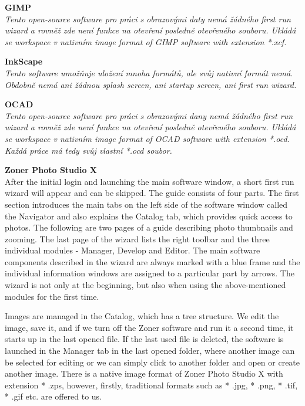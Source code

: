 \documentclass[a4paper,10pt,twoside]{article}
\begin{document}
\noindent \textbf{GIMP} \\

\noindent \textit{\color{red}Tento open-source software pro práci s obrazovými daty nemá žádného first run wizard a rovněž zde není funkce na otevření posledně otevřeného souboru. Ukládá se workspace v nativním image format of GIMP software with extension *.xcf.}

\noindent \textbf{InkScape} \\

\noindent \textit{\color{red}Tento software umožňuje uložení mnoha formátů, ale svůj nativní formát nemá. Obdobně nemá ani žádnou splash screen, ani startup screen, ani first run wizard.}

\noindent \textbf{OCAD} \\

\noindent \textit{\color{red}Tento open-source software pro práci s obrazovými dany nemá žádného first run wizard a rovněž zde není funkce na otevření posledně otevřeného souboru. Ukládá se workspace v nativním image format of OCAD software with extension *.ocd. Každá práce má tedy svůj vlastní *.ocd soubor.}

\noindent \textbf{Zoner Photo Studio X} \\

\noindent After the initial login and launching the main software window, a short first run wizard will appear and can be skipped. The guide consists of four parts. The first section introduces the main tabs on the left side of the software window called the Navigator and also explains the Catalog tab, which provides quick access to photos. The following are two pages of a guide describing photo thumbnails and zooming. The last page of the wizard lists the right toolbar and the three individual modules - Manager, Develop and Editor. The main software components described in the wizard are always marked with a blue frame and the individual information windows are assigned to a particular part by arrows. The wizard is not only at the beginning, but also when using the above-mentioned modules for the first time.

Images are managed in the Catalog, which has a tree structure. We edit the image, save it, and if we turn off the Zoner software and run it a second time, it starts up in the last opened file. If the last used file is deleted, the software is launched in the Manager tab in the last opened folder, where another image can be selected for editing or we can simply click to another folder and open or create another image. There is a native image format of Zoner Photo Studio X with extension * .zps, however, firstly, traditional formats such as * .jpg, * .png, * .tif, * .gif etc. are offered to us.
\end{document}
